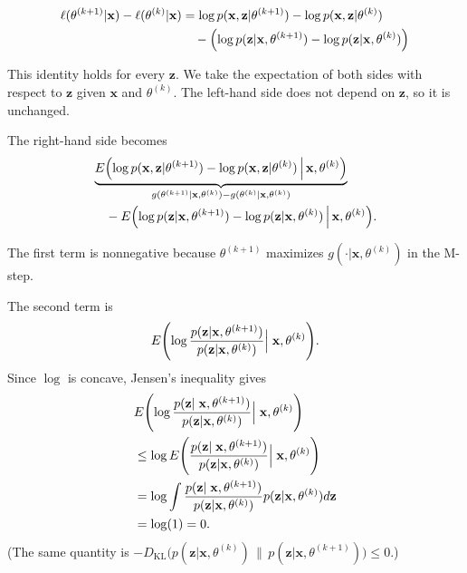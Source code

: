 \documentclass[
]{book}
\begin{document}
\begin{align*}
\ell(\theta^{(k+1)}|\mathbf{x}) -  \ell(\theta^{(k)}|\mathbf{x}) &= \log p(\mathbf{x}, \mathbf{z}|\theta^{(k+1)}) - \log p(\mathbf{x}, \mathbf{z}|\theta^{(k)}) \\
&\quad - \Bigl( \log p( \mathbf{z}|\mathbf{x},\theta^{(k+1)}) - \log p( \mathbf{z}| \mathbf{x}, \theta^{(k)})\Bigr)
\end{align*}

This identity holds for every \(\mathbf{z}\). We take the expectation of both sides with respect to \(\mathbf{z}\) given \(\mathbf{x}\) and \(\theta^{(k)}\). The left-hand side does not depend on \(\mathbf{z}\), so it is unchanged.

The right-hand side becomes
\begin{align*}
& \underbrace{E \Bigl( \log p(\mathbf{x}, \mathbf{z}| \theta^{(k+1)}) - \log p(\mathbf{x}, \mathbf{z}| \theta^{(k)} )\,\Big|\, \mathbf{x}, \theta^{(k)} \Bigr)}_{g(\theta^{(k+1)}|\mathbf{x}, \theta^{(k)}) - g(\theta^{(k)}|\mathbf{x}, \theta^{(k)})} \\
& \quad - E \Bigl( \log p( \mathbf{z}| \mathbf{x},\theta^{(k+1)}) - \log p(\mathbf{z}| \mathbf{x}, \theta^{(k)}) \,\Big|\, \mathbf{x}, \theta^{(k)} \Bigr).
\end{align*}

The first term is nonnegative because \(\theta^{(k+1)}\) maximizes \(g(\cdot|\mathbf{x}, \theta^{(k)})\) in the M-step.

The second term is
\[  E \Biggl( \log \frac{ p( \mathbf{z}| \mathbf{x},\theta^{(k+1)})}{ p(\mathbf{z}| \mathbf{x}, \theta^{(k)} )} \Bigl |\; \mathbf{x}, \theta^{(k)} \Biggr). \]
Since \(\log\) is concave, Jensen's inequality gives
\begin{align*}
& E \Biggl( \log \frac{ p( \mathbf{z}| \; \mathbf{x},\theta^{(k+1)})}{ p(\mathbf{z}| \mathbf{x}, \theta^{(k)} ) } \Bigl | \;\mathbf{x}, \theta^{(k)} \Biggr) \\
&\leq \log  E \Biggl(\frac{ p( \mathbf{z}| \; \mathbf{x},\theta^{(k+1)})}{ p(\mathbf{z}| \mathbf{x}, \theta^{(k)}) } \Bigl |\; \mathbf{x}, \theta^{(k)} \Biggr)  \\
&= \log \int \frac{ p( \mathbf{z}|\; \mathbf{x},\theta^{(k+1)})}{ p(\mathbf{z}| \mathbf{x}, \theta^{(k)}) } p(\mathbf{z}| \mathbf{x}, \theta^{(k)})  d\mathbf{z}\\
&= \log(1) = 0.
 \end{align*}
(The same quantity is \(-D_{\mathrm{KL}}\bigl(p(\mathbf{z}|\mathbf{x},\theta^{(k)}) \,\|\, p(\mathbf{z}|\mathbf{x},\theta^{(k+1)})\bigr) \leq 0\).)
\end{document}
